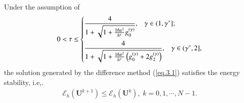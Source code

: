 \documentclass{siamart171218}
\numberwithin{theorem}{section}
\numberwithin{equation}{section}
\begin{document}
\begin{theorem}\label{Th.3.13}
Under the assumption of
\begin{align}\label{eq.3.19}
0<\tau\leq
\left\{
\begin{aligned}
  &\frac{4}{1+\sqrt{{1+\frac{16\varepsilon^2}{h^\gamma} g_{0}^{(\gamma)}}}}
  ,\;\;\;\gamma\in(1,\gamma^{*}];\vspace{0.2cm}\\
 & \frac{4}
 {1+\sqrt{{1+ \frac{16\varepsilon^2}{h^\gamma}\left(g_{0}^{(\gamma)}+2g_{2}^{(\gamma)}\right)}}}
,\;\;\;
  \gamma\in(\gamma^{*},2],
\end{aligned}
\right.
\end{align}
the solution generated by the difference method (\ref{eq.3.1}) satisfies
 the energy stability, i.e,.
 \begin{equation*}
\begin{aligned}\displaystyle
{\mathcal{E}}_h\left(\mathbf{U}^{k+1}\right)\leq{\mathcal{E}}_h\left(\mathbf{U}^{k}\right),\;k=0,1,\cdots,N-1.
\end{aligned}
\end{equation*}
\end{theorem}
\end{document}
